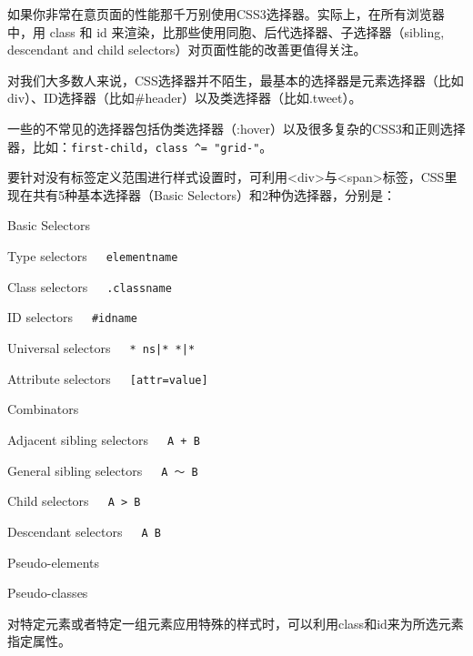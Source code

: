 \vspace{-30pt}

\begin{shaded}
\noindent 如果你非常在意页面的性能那千万别使用CSS3选择器。实际上，在所有浏览器中，用 class 和 id 来渲染，比那些使用同胞、后代选择器、子选择器（sibling, descendant and child selectors）对页面性能的改善更值得关注。
\end{shaded}




对我们大多数人来说，CSS选择器并不陌生，最基本的选择器是元素选择器（比如div）、ID选择器（比如\#header）以及类选择器（比如.tweet）。



一些的不常见的选择器包括伪类选择器（:hover）以及很多复杂的CSS3和正则选择器，比如：\texttt{first-child}，\texttt{class \^{}= "grid-"}。

要针对没有标签定义范围进行样式设置时，可利用<div>与<span>标签，CSS里现在共有5种基本选择器（Basic Selectors）和2种伪选择器，分别是：

\begin{compactitem}
\item Basic Selectors
	\begin{compactitem}[$\circ$]
	\item Type selectors~~~\texttt{elementname}
	\item Class selectors~~~\texttt{.classname}
	\item ID selectors~~~\texttt{\#idname}
	\item Universal selectors~~~\texttt{*~ns|*~*|*}
	\item Attribute selectors~~~\texttt{[attr=value]}
	\end{compactitem}
\item Combinators
	\begin{compactitem}[$\circ$]
	\item Adjacent sibling selectors~~~\texttt{A + B}
	\item General sibling selectors~~~\texttt{A ～ B}
	\item Child selectors~~~\texttt{A > B}
	\item Descendant selectors~~~\texttt{A B}
	\end{compactitem}
\item Pseudo-elements
\item Pseudo-classes
\end{compactitem}

对特定元素或者特定一组元素应用特殊的样式时，可以利用class和id来为所选元素指定属性。

